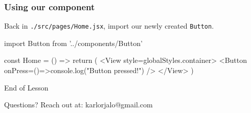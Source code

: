 \documentclass{beamer}
\begin{document}
  \begin{frame}[fragile]
    \frametitle{Using our component}
    Back in \verb|./src/pages/Home.jsx|, import our newly created \verb|Button|.

    \vspace{0.5cm}
    \begin{jscodesmall}
import Button from '../components/Button'

const Home = () => {
  return (
    <View style={globalStyles.container}>
      <Button onPress={()=>{console.log("Button pressed!")}} />
    </View>
  )
}
    \end{jscodesmall}
  \end{frame}

  \appendix

  \begin{frame}[standout]
    End of Lesson

    {\small Questions? Reach out at:}
    {\footnotesize karlorjalo@gmail.com}
  \end{frame}
\end{document}
